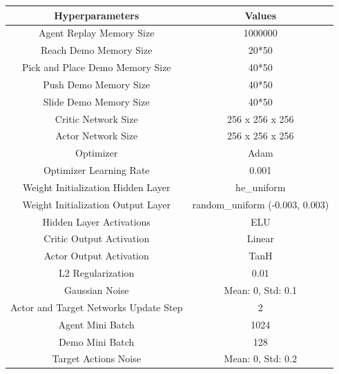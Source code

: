 \begin{table}[h!]
\centering
\begin{tabular}{|c|c|}
\hline
\textbf{Hyperparameters}                       & \textbf{Values}                          \\ \hline
Agent Replay Memory Size              & 1000000                         \\ \hline
Reach Demo Memory Size                & 20*50                           \\ \hline
Pick and Place Demo Memory Size       & 40*50                           \\ \hline
Push Demo Memory Size                 & 40*50                           \\ \hline
Slide Demo Memory Size                & 40*50                           \\ \hline
Critic Network Size                   & 256 x 256 x 256                 \\ \hline
Actor Network Size                    & 256 x 256 x 256                 \\ \hline
Optimizer                             & Adam                            \\ \hline
Optimizer Learning Rate               & 0.001                           \\ \hline
Weight Initialization Hidden Layer    & he\_uniform                     \\ \hline
Weight Initialization Output Layer    & random\_uniform (-0.003, 0.003) \\ \hline
Hidden Layer Activations              & ELU                             \\ \hline
Critic Output Activation              & Linear                          \\ \hline
Actor Output Activation               & TanH                            \\ \hline
L2 Regularization                     & 0.01                            \\ \hline
Gaussian Noise                        & Mean: 0, Std: 0.1               \\ \hline
Actor and Target Networks Update Step & 2                               \\ \hline
Agent Mini Batch                      & 1024                            \\ \hline
Demo Mini Batch                       & 128                             \\ \hline
Target Actions Noise                  & Mean: 0, Std: 0.2               \\ \hline

\end{tabular}
\end{table}
